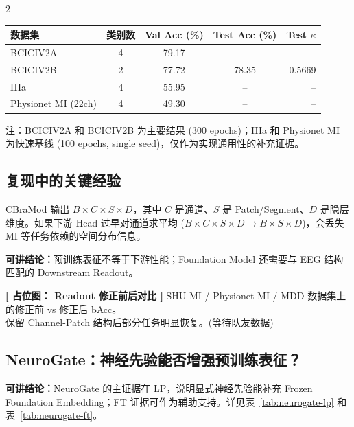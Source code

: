\documentclass[12pt, a0paper]{article}
\renewcommand{\Large}{\fontsize{34}{42}\selectfont}
\renewcommand{\small}{\fontsize{18}{24}\selectfont}
\renewcommand{\footnotesize}{\fontsize{15}{20}\selectfont}
\newcommand{\placeholder}[2]{%
    \begin{center}
    \colorbox{mygray!12}{\parbox{0.9\columnwidth}{%
        \centering
        \vspace{1.5em}
        {\Large\bfseries\color{mygray} [ 占位图： #1 ]}
        \vspace{0.8em}
        {\small\color{mygray} #2}
        \vspace{1.5em}
    }}
    \end{center}
}
\begin{document}
\begin{multicols}{2}
{\footnotesize
\begin{center}
\begin{tabular}{lcccr}
\toprule
\textbf{数据集} & \textbf{类别数} & \textbf{Val Acc (\%)} & \textbf{Test Acc (\%)} & \textbf{Test \(\kappa\)} \\
\midrule
BCICIV2A & 4 & 79.17 & -- & -- \\
BCICIV2B & 2 & 77.72 & 78.35 & 0.5669 \\
IIIa & 4 & 55.95 & -- & -- \\
Physionet MI (22ch) & 4 & 49.30 & -- & -- \\
\bottomrule
\end{tabular}
\end{center}
\vspace{0.3em}
{\small\color{mygray}注：BCICIV2A 和 BCICIV2B 为主要结果 (300 epochs)；IIIa 和 Physionet MI 为快速基线 (100 epochs, single seed)，仅作为实现通用性的补充证据。}
}

\subsection{复现中的关键经验}

CBraMod 输出 $B \times C \times S \times D$，其中 $C$ 是通道、$S$ 是 Patch/Segment、$D$ 是隐层维度。如果下游 Head 过早对通道求平均 ($B \times C \times S \times D \rightarrow B \times S \times D$)，会丢失 MI 等任务依赖的空间分布信息。

\textbf{可讲结论：}预训练表征不等于下游性能；Foundation Model 还需要与 EEG 结构匹配的 Downstream Readout。

\placeholder{Readout 修正前后对比}{%
    SHU-MI / Physionet-MI / MDD 数据集上的修正前 vs 修正后 bAcc。\\
    保留 Channel-Patch 结构后部分任务明显恢复。\quad (等待队友数据)}

\subsection{NeuroGate：神经先验能否增强预训练表征？}

\textbf{可讲结论：}NeuroGate 的主证据在 LP，说明显式神经先验能补充 Frozen Foundation Embedding；FT 证据可作为辅助支持。详见表~\ref{tab:neurogate-lp} 和表~\ref{tab:neurogate-ft}。


\end{multicols}
\end{document}
